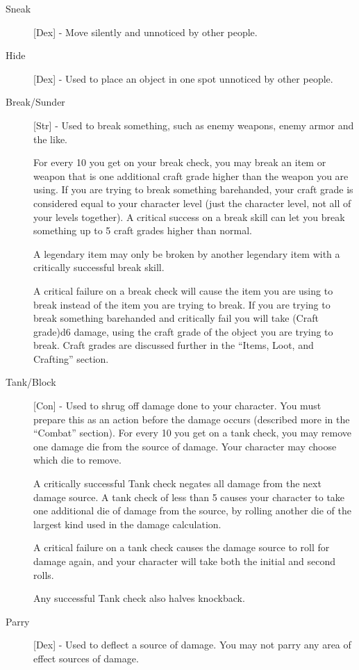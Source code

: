 \begin{description}
\item[Sneak] [Dex] - Move silently and unnoticed by other people.
\item[Hide] [Dex] - Used to place an object in one spot unnoticed by other people. 
\item[Break/Sunder] [Str] - Used to break something, such as enemy weapons, enemy armor and the like.

For every 10 you get on your break check, you may break an item or weapon that is one additional craft grade higher than the weapon you are using. If you are trying to break something barehanded, your craft grade is considered equal to your character level (just the character level, not all of your levels together). A critical success on a break skill can let you break something up to 5 craft grades higher than normal.

A legendary item may only be broken by another legendary item with a critically successful break skill.

A critical failure on a break check will cause the item you are using to break instead of the item you are trying to break. If you are trying to break something barehanded and critically fail you will take (Craft grade)d6 damage, using the craft grade of the object you are trying to break. Craft grades are discussed further in the ``Items, Loot, and Crafting'' section.

\item[Tank/Block] [Con] - Used to shrug off damage done to your character. You must prepare this as an action before the damage occurs (described more in the ``Combat'' section).
For every 10 you get on a tank check, you may remove one damage die from the source of damage. Your character may choose which die to remove.

A critically successful Tank check negates all damage from the next damage source. A tank check of less than 5 causes your character to take one additional die of damage from the source, by rolling another die of the largest kind used in the damage calculation.

A critical failure on a tank check causes the damage source to roll for damage again, and your character will take both the initial and second rolls.

Any successful Tank check also halves knockback.
\item[Parry] [Dex] - Used to deflect a source of damage. You may not parry any area of effect sources of damage.


\end{description}
